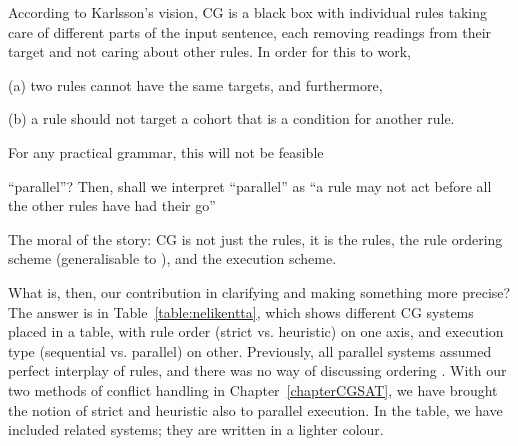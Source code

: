 According to Karlsson's vision, CG is a black box with individual rules taking care of different parts of the input sentence, each removing readings from their target and not caring about other rules.
In order for this to work, 
\begin{inparaenum}
\item[(a)] two rules cannot have the same targets, and furthermore,
\item[(b)] a rule should not target a cohort that is a condition for another rule.
\end{inparaenum}
For any practical grammar, this will not be feasible





``parallel''? Then, shall we interpret ``parallel'' as ``a rule may not act before all the other rules have had their go''


The moral of the story: CG is not just the rules, it is the rules, the rule ordering scheme (generalisable to ), and the execution scheme. 





What is, then, our contribution in clarifying and making something more precise?
The answer is in Table~\ref{table:nelikentta}, which shows different CG systems 
placed in a table, with rule order (strict vs. heuristic) on one axis, 
and execution type (sequential vs. parallel) on other.
Previously, all parallel systems assumed perfect interplay of rules, 
and there was no way of discussing ordering . 
With our two methods of conflict handling in Chapter~\ref{chapterCGSAT}, 
we have brought the notion of strict and heuristic also to parallel execution. 
In the table, we have included related systems; they are written in a lighter colour.

